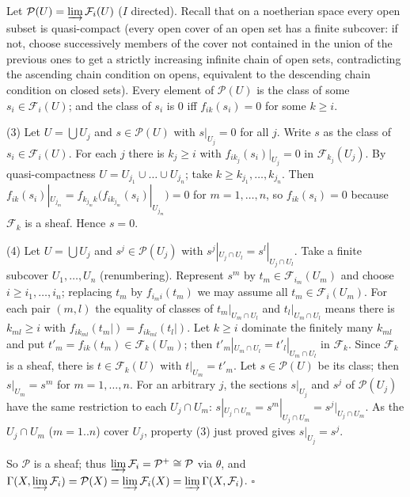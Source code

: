 \documentclass[11pt]{article}
\begin{document}
\pf
Let $\mathcal P(U)=\varinjlim\mathcal F_i(U)$ ($I$ directed). Recall that on a noetherian space every open subset is quasi-compact (every open cover of an open set has a finite subcover: if not, choose successively members of the cover not contained in the union of the previous ones to get a strictly increasing infinite chain of open sets, contradicting the ascending chain condition on opens, equivalent to the descending chain condition on closed sets). Every element of $\mathcal P(U)$ is the class of some $s_i\in\mathcal F_i(U)$; and the class of $s_i$ is $0$ iff $f_{ik}(s_i)=0$ for some $k\ge i$.

(3) Let $U=\bigcup U_j$ and $s\in\mathcal P(U)$ with $s|_{U_j}=0$ for all $j$. Write $s$ as the class of $s_i\in\mathcal F_i(U)$. For each $j$ there is $k_j\ge i$ with $f_{ik_j}(s_i)|_{U_j}=0$ in $\mathcal F_{k_j}(U_j)$. By quasi-compactness $U=U_{j_1}\cup\dots\cup U_{j_n}$; take $k\ge k_{j_1},\dots,k_{j_n}$. Then $f_{ik}(s_i)|_{U_{j_m}}=f_{k_{j_m}k}\bigl(f_{ik_{j_m}}(s_i)|_{U_{j_m}}\bigr)=0$ for $m=1,\dots,n$, so $f_{ik}(s_i)=0$ because $\mathcal F_k$ is a sheaf. Hence $s=0$.

(4) Let $U=\bigcup U_j$ and $s^j\in\mathcal P(U_j)$ with $s^j|_{U_j\cap U_l}=s^l|_{U_j\cap U_l}$. Take a finite subcover $U_1,\dots,U_n$ (renumbering). Represent $s^m$ by $t_m\in\mathcal F_{i_m}(U_m)$ and choose $i\ge i_1,\dots,i_n$; replacing $t_m$ by $f_{i_mi}(t_m)$ we may assume all $t_m\in\mathcal F_i(U_m)$. For each pair $(m,l)$ the equality of classes of $t_m|_{U_m\cap U_l}$ and $t_l|_{U_m\cap U_l}$ means there is $k_{ml}\ge i$ with $f_{ik_{ml}}(t_m|)=f_{ik_{ml}}(t_l|)$. Let $k\ge i$ dominate the finitely many $k_{ml}$ and put $t'_m=f_{ik}(t_m)\in\mathcal F_k(U_m)$; then $t'_m|_{U_m\cap U_l}=t'_l|_{U_m\cap U_l}$ in $\mathcal F_k$. Since $\mathcal F_k$ is a sheaf, there is $t\in\mathcal F_k(U)$ with $t|_{U_m}=t'_m$. Let $s\in\mathcal P(U)$ be its class; then $s|_{U_m}=s^m$ for $m=1,\dots,n$. For an arbitrary $j$, the sections $s|_{U_j}$ and $s^j$ of $\mathcal P(U_j)$ have the same restriction to each $U_j\cap U_m$: $s|_{U_j\cap U_m}=s^m|_{U_j\cap U_m}=s^j|_{U_j\cap U_m}$. As the $U_j\cap U_m$ ($m=1..n$) cover $U_j$, property (3) just proved gives $s|_{U_j}=s^j$.

So $\mathcal P$ is a sheaf; thus $\varinjlim\mathcal F_i=\mathcal P^+\cong\mathcal P$ via $\theta$, and $\Gamma(X,\varinjlim\mathcal F_i)=\mathcal P(X)=\varinjlim\mathcal F_i(X)=\varinjlim\Gamma(X,\mathcal F_i)$. \hfill$\square$
\end{document}
